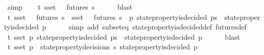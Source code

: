 \begin{isabellebody}
\ simp\isanewline
\ \ \isamarkupfalse%
\ {\isachardoublequoteopen}{\isasymexists}{\isasymsigma}{\isasymin}{\isasymSigma}t{\isachardot}\ {\isasymforall}s{\isasymin}{\isasymsigma}{\isacharunderscore}set{\isachardot}\ {\isasymsigma}\ {\isasymin}\ futures\ s{\isachardoublequoteclose}\isanewline
\ \ \ \ \isamarkupfalse%
\ blast\isanewline
\ \ \isamarkupfalse%
\ {\isachardoublequoteopen}{\isasymexists}{\isasymsigma}{\isasymin}{\isasymSigma}t{\isachardot}\ {\isacharparenleft}{\isasymforall}s{\isasymin}{\isasymsigma}{\isacharunderscore}set{\isachardot}\ {\isasymsigma}\ {\isasymin}\ futures\ s{\isacharparenright}\ {\isasymand}\ {\isacharparenleft}{\isasymforall}s{\isasymin}{\isasymsigma}{\isacharunderscore}set{\isachardot}\ {\isasymsigma}\ {\isasymin}\ futures\ s\ {\isasymlongrightarrow}\ {\isacharparenleft}{\isasymforall}p{\isachardot}\ state{\isacharunderscore}property{\isacharunderscore}is{\isacharunderscore}decided\ {\isacharparenleft}p{\isacharcomma}s{\isacharparenright}\ {\isasymlongrightarrow}\ state{\isacharunderscore}property{\isacharunderscore}is{\isacharunderscore}decided\ {\isacharparenleft}p{\isacharcomma}{\isasymsigma}{\isacharparenright}{\isacharparenright}{\isacharparenright}{\isachardoublequoteclose}\isanewline
\ \ \ \ \isamarkupfalse%
\ {\isacharparenleft}simp\ add{\isacharcolon}\ subset{\isacharunderscore}eq\ state{\isacharunderscore}property{\isacharunderscore}is{\isacharunderscore}decided{\isacharunderscore}def\ futures{\isacharunderscore}def{\isacharparenright}\isanewline
\ \ \isamarkupfalse%
\ {\isachardoublequoteopen}{\isasymexists}{\isasymsigma}{\isasymin}{\isasymSigma}t{\isachardot}\ {\isasymforall}s{\isasymin}{\isasymsigma}{\isacharunderscore}set{\isachardot}\ {\isacharparenleft}{\isasymforall}p{\isachardot}\ state{\isacharunderscore}property{\isacharunderscore}is{\isacharunderscore}decided\ {\isacharparenleft}p{\isacharcomma}s{\isacharparenright}\ {\isasymlongrightarrow}\ state{\isacharunderscore}property{\isacharunderscore}is{\isacharunderscore}decided\ {\isacharparenleft}p{\isacharcomma}{\isasymsigma}{\isacharparenright}{\isacharparenright}{\isachardoublequoteclose}\isanewline
\ \ \ \ \isamarkupfalse%
\ blast\isanewline
\ \ \isamarkupfalse%
\ {\isachardoublequoteopen}{\isasymexists}{\isasymsigma}{\isasymin}{\isasymSigma}t{\isachardot}\ {\isasymforall}s{\isasymin}{\isasymsigma}{\isacharunderscore}set{\isachardot}\ {\isacharparenleft}{\isasymforall}p\ {\isasymin}\ state{\isacharunderscore}property{\isacharunderscore}decisions\ s{\isachardot}\ state{\isacharunderscore}property{\isacharunderscore}is{\isacharunderscore}decided\ {\isacharparenleft}p{\isacharcomma}{\isasymsigma}{\isacharparenright}{\isacharparenright}{\isachardoublequoteclose}\isanewline

\end{isabellebody}
